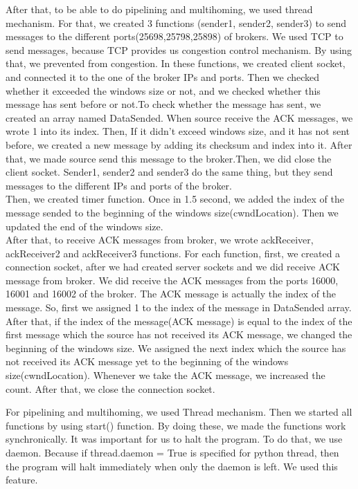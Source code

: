\documentclass[conference]{IEEEtran}
\begin{document}
After that, to be able to do pipelining and multihoming, we used thread mechanism. For that, we created 3 functions (sender1, sender2, sender3) to send messages to the different ports(25698,25798,25898) of brokers. We used TCP to send messages, because TCP provides us congestion control mechanism. By using that, we prevented from congestion. In these functions, we created client socket, and connected it to the one of the broker IPs and ports. Then we checked whether it exceeded the windows size or not, and we checked whether this message has sent before or not.To check whether the message has sent, we created an array named DataSended. When source receive the ACK messages, we wrote 1 into its index. Then, If it didn't exceed windows size, and it has not sent before, we created a new message by adding its checksum and index into it. After that, we made source send this message to the broker.Then, we did close the client socket. Sender1, sender2 and sender3 do the same thing, but they send messages to the different IPs and ports of the broker.\\

Then, we created timer function. Once in 1.5 second, we added the index of the message sended to the beginning of the windows size(cwndLocation). Then we updated the end of the windows size.\\

After that, to receive ACK messages from broker, we wrote ackReceiver, ackReceiver2 and ackReceiver3 functions. For each function, first, we created a connection socket, after we had created server sockets and we did receive ACK message from broker. We did receive the ACK messages from the ports 16000, 16001 and 16002 of the broker. The ACK message is actually the index of the message. So, first we assigned 1 to the index of the message in DataSended array. After that, if the index of the message(ACK message) is equal to the index of the first message which the source has not received its ACK message, we changed the beginning of the windows size. We assigned the next index which the source has not received its ACK message yet to the beginning of the windows size(cwndLocation). Whenever we take the ACK message, we increased the count. After that, we close the connection socket. 

For pipelining and multihoming, we used Thread mechanism. Then we started all functions by using start() function. By doing these, we made the functions work synchronically. It was important for us to halt the program. To do that, we use daemon. Because if thread.daemon = True is specified for python thread, then the program will halt immediately when only the daemon is left. We used this feature.\\
\end{document}
